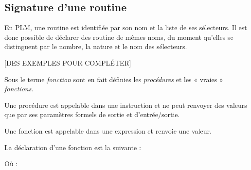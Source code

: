 \subsection{Signature d'une routine}

En PLM, une routine est identifiée par son nom et la liste de ses sélecteurs. Il est donc possible de déclarer des routine de mêmes noms, du moment qu'elles se distinguent par le nombre, la nature et le nom des sélecteurs.

[DES EXEMPLES POUR COMPLÉTER] 














 



















Sous le terme \emph{fonction} sont en fait définies les \emph{procédures} et les « vraies » \emph{fonctions}.

Une procédure est appelable dans une instruction et ne peut renvoyer des valeurs que par ses paramètres formels de sortie et d'entrée/sortie.

Une fonction est appelable dans une expression et renvoie une valeur.






La déclaration d'une fonction est la suivante :
Où :

